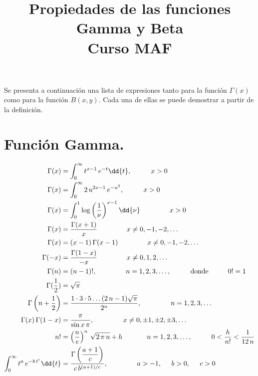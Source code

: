 
\setlength{\jot}{12pt}
\title{Propiedades de las funciones Gamma y Beta \\ {\large Curso MAF}}
\author{}
\date{}

\maketitle
\fontsize{14}{14}\selectfont
Se presenta a continuación una lista de expresiones tanto para la función $\Gamma (x)$ como para la función $B (x, y)$. Cada una de ellas se puede demostrar a partir de la definición.
\section{Función Gamma.}
\begingroup
\allowdisplaybreaks
\begin{align*}
\Gamma (x) &= \int_{0}^{\infty} t^{x-1} \, e^{-t} \dd{t} , \hspace{1cm} x > 0 \\
\Gamma (x) &= \int_{0}^{\infty} 2 \, u^{2 x - 1} \, e^{-u^{2}} , \hspace{1cm} x > 0 \\
\Gamma (x) &= \int_{0}^{1} \log \left( \dfrac{1}{\nu} \right)^{x - 1} \dd{\nu} \hspace{1.5cm} x > 0 \\
\Gamma (x) &= \dfrac{\Gamma(x + 1)}{x} \hspace{1.5cm} x \neq 0, -1, -2, \ldots \\
\Gamma (x) &= (x - 1) \, \Gamma(x - 1) \hspace{1.5cm} x \neq 0, -1, -2, \ldots \\
\Gamma (-x) &= \dfrac{\Gamma (1- x)}{-x} \hspace{1.5cm} x \neq 0, 1, 2, \ldots \\
\Gamma (n) &= (n - 1)!, \hspace{1.5cm} n = 1, 2, 3, \ldots, \hspace{1cm} \mbox{donde} \hspace{1cm} 0! = 1 \\
\Gamma (\dfrac{1}{2}) &= \sqrt{\pi} \\
\Gamma \left(n + \dfrac{1}{2} \right) &= \dfrac{1 \cdot 3 \cdot 5 \ldots (2 \, n - 1)\sqrt{\pi}}{2^{n}}, \hspace{1.5cm} n = 1, 2, 3, \ldots \\
\Gamma (x) \, \Gamma (1 - x) &= \dfrac{\pi}{\sin x \, \pi}, \hspace{1.5cm} x \neq 0, \pm 1, \pm 2, \pm 3, \ldots \\
n! &= \left( \dfrac{n}{e} \right)^{n} \, \sqrt{2 \, \pi \, n} + h \hspace{1.25cm} n = 1, 2, 3, \ldots, \hspace{1cm} 0 < \dfrac{h}{n!} < \dfrac{1}{12 \, n} \\
\int_{0}^{\infty} t^{a} \, e^{-b \, t^{c}} \dd{t} &= \dfrac{\Gamma \left(\dfrac{a + 1}{c} \right)}{c \, b^{(a+1)/c}}, \hspace{1.5cm} a > -1, \hspace{0.5cm} b > 0, \hspace{0.5cm} c >0
\end{align*}
